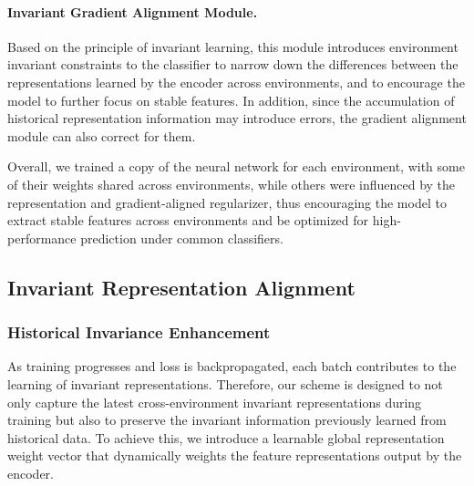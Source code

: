 \paragraph{Invariant Gradient Alignment Module.} Based on the principle of invariant learning, this module introduces environment invariant constraints to the classifier to narrow down the differences between the representations learned by the encoder across environments, and to encourage the model to further focus on stable features. In addition, since the accumulation of historical representation information may introduce errors, the gradient alignment module can also correct for them.

Overall, we trained a copy of the neural network for each environment, with some of their weights shared across environments, while others were influenced by the representation and gradient-aligned regularizer, thus encouraging the model to extract stable features across environments and be optimized for high-performance prediction under common classifiers.

\subsection{Invariant Representation Alignment}
\label{representation_alignment}
\subsubsection{Historical Invariance Enhancement}
As training progresses and loss is backpropagated, each batch contributes to the learning of invariant representations. Therefore, our scheme is designed to not only capture the latest cross-environment invariant representations during training but also to preserve the invariant information previously learned from historical data. To achieve this, we introduce a learnable global representation weight vector that dynamically weights the feature representations output by the encoder.

